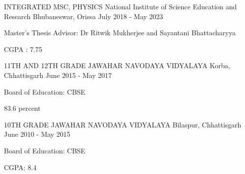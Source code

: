 

\begin{cventries}

  \cventry
    {INTEGRATED MSC, PHYSICS} %
    {National Institute of Science Education and Research} %
    {Bhubaneswar, Orissa} %
    {July 2018 - May 2023} %
    {
      \begin{cvitems} %
        \item {Master’s Thesis Advisor: Dr Ritwik Mukherjee and Sayantani Bhattacharyya}
        \item {CGPA : 7.75}
      \end{cvitems}
    }

  \cventry
    {11TH AND 12TH GRADE} %
    {JAWAHAR NAVODAYA VIDYALAYA} %
    {Korba, Chhattisgarh} %
    {June 2015 - May 2017} %
    {
      \begin{cvitems} %
        \item {Board of Education: CBSE}
        \item83.6 percent 
      \end{cvitems}
    } %

  \cventry
    {10TH GRADE} %
    {JAWAHAR NAVODAYA VIDYALAYA} %
    {Bilaspur, Chhattisgarh} %
    {June 2010 - May 2015} %
    {
      \begin{cvitems} %
        \item {Board of Education: CBSE}
        \item CGPA: 8.4
      \end{cvitems}
    }

\end{cventries}
